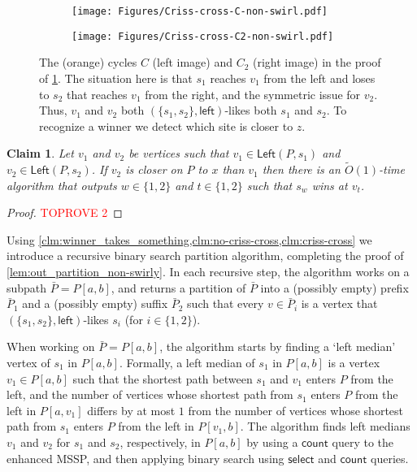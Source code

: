 \documentclass{article}
\newcommand{\Left}{\mathsf{Left}}
\newcommand{\leftside}{\mathsf{left}}
\newcommand{\countA}{\mathsf{count}}
\newcommand{\select}{\mathsf{select}}
\newtheorem{claim}{Claim}
\newcommand{\Otild}{\tilde{O}}
\begin{document}
\begin{figure}[ht]
    \centering
    \begin{subfigure}[t]{0.3\textwidth}
        \centering
        \texttt{[image: Figures/Criss-cross-C-non-swirl.pdf]}
               \label{fig:figure1}
    \end{subfigure}
    \hspace{1in}
    \begin{subfigure}[t]{0.3\textwidth}
        \centering
        \texttt{[image: Figures/Criss-cross-C2-non-swirl.pdf]}

        \label{fig:figure2}
    \end{subfigure}
    \caption{The (orange) cycles $C$ (left image) and $C_2$ (right image) in the proof of \cref{clm:criss-cross}.
    The situation here is that $s_1$ reaches $v_1$ from the left and loses to $s_2$ that reaches $v_1$ from the right, and the symmetric issue for $v_2$.
    Thus, $v_1$ and $v_2$ both $(\{s_1,s_2\},\leftside)$-likes both $s_1$ and $s_2$.
    To recognize a winner we detect which site is closer to $z$.}
    \label{fig:criss-cross}
\end{figure}

\begin{claim}\label{clm:criss-cross}
    Let $v_1$ and $v_2$ be  vertices such that $v_1\in\Left(P,s_1)$ and $v_2\in\Left(P,s_2)$.
    If $v_2$ is closer on $P$ to $x$ than $v_1$ then there is an $\Otild(1)$-time algorithm that outputs $w\in\{1,2\}$ and $t\in\{1,2\}$ such that $s_w$ wins at $v_t$.
\end{claim}
\begin{proof}\textcolor{red}{TOPROVE 2}\end{proof}


Using \cref{clm:winner_takes_something,clm:no-criss-cross,clm:criss-cross} we introduce a recursive binary search partition algorithm, completing the proof of \cref{lem:out_partition_non-swirly}.
In each recursive step, the algorithm works on a subpath $\bar P=P[a,b]$, and returns a partition of $\bar P$ into a (possibly empty) prefix $\bar P_1$ and a (possibly empty) suffix $\bar P_2$  such that every $v\in\bar P_i$  is a vertex that $(\{s_1,s_2\},\leftside)$-likes $s_i$ (for $i\in\{1,2\}$).

When working on $\bar P = P[a,b]$, the algorithm starts by finding a `left median' vertex of $s_1$ in $P[a,b]$.
Formally, a left median of $s_1$ in $P[a,b]$ is a vertex $v_1 \in P[a,b]$ such that the shortest path between $s_1$ and $v_1$ enters $P$ from the left, and the number of vertices whose shortest path from $s_1$ enters $P$ from the left  in $P[a,v_1]$ differs by at most  $1$ from the number of vertices whose shortest path from $s_1$ enters $P$ from the left in $P[v_1,b]$.
The algorithm finds left medians $v_1$ and $v_2$ for $s_1$ and $s_2$, respectively, in $P[a,b]$ by using a $\countA$ query to the enhanced MSSP, and then applying binary search using $\select$ and $\countA$ queries.
\end{document}
